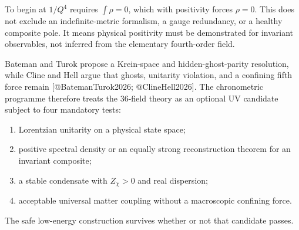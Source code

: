 \documentclass[
]{article}
\providecommand{\tightlist}{%
  \setlength{\itemsep}{0pt}\setlength{\parskip}{0pt}}
\begin{document}
To begin at \(1/Q^4\) requires \(\int\rho=0\), which with positivity
forces \(\rho=0\). This does not exclude an indefinite-metric formalism,
a gauge redundancy, or a healthy composite pole. It means physical
positivity must be demonstrated for invariant observables, not inferred
from the elementary fourth-order field.

Bateman and Turok propose a Krein-space and hidden-ghost-parity
resolution, while Cline and Hell argue that ghosts, unitarity violation,
and a confining fifth force remain {[}@BatemanTurok2026;
@ClineHell2026{]}. The chronometric programme therefore treats the
36-field theory as an optional UV candidate subject to four mandatory
tests:

\begin{enumerate}
\def\labelenumi{\arabic{enumi}.}
\tightlist
\item
  Lorentzian unitarity on a physical state space;
\item
  positive spectral density or an equally strong reconstruction theorem
  for an invariant composite;
\item
  a stable condensate with \(Z_\chi>0\) and real dispersion;
\item
  acceptable universal matter coupling without a macroscopic confining
  force.
\end{enumerate}

The safe low-energy construction survives whether or not that candidate
passes.
\end{document}
